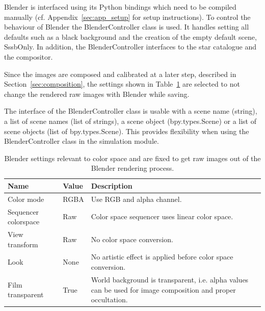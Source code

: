 Blender is interfaced using its Python bindings which need to be compiled manually (cf. Appendix~\ref{sec:app_setup} for setup instructions). To control the behaviour of Blender the BlenderController class is used. It handles setting all defaults such as a black background and the creation of the empty default scene, SssbOnly. In addition, the BlenderController interfaces to the star catalogue and the compositor.

Since the images are composed and calibrated at a later step, described in Section~\ref{sec:composition}, the settings shown in Table~\ref{tab:color_space} are selected to not change the rendered raw images with Blender while saving.

The interface of the BlenderController class is usable with a scene name (string), a list of scene names (list of strings), a scene object (bpy.types.Scene) or a list of scene objects (list of bpy.types.Scene). This provides flexibility when using the BlenderController class in the simulation module.

\begin{table}[htb]
    \centering
    \caption{Blender settings relevant to color space and are fixed to get raw images out of the Blender rendering process.}
    \label{tab:color_space}
    \begin{tabular}{p{}|p{}|p{}}
        \textbf{Name}        & \textbf{Value} & \textbf{Description} \\ \hline
        Color mode           & RGBA           & Use RGB and alpha channel. \\
        Sequencer colorspace & Raw            & Color space sequencer uses linear color space. \\
        View transform       & Raw            & No color space conversion. \\
        Look                 & None           & No artistic effect is applied before color space conversion. \\
        Film transparent     & True           & World background is transparent, i.e. alpha values can be used for image composition and proper occultation.
    \end{tabular}
\end{table}

